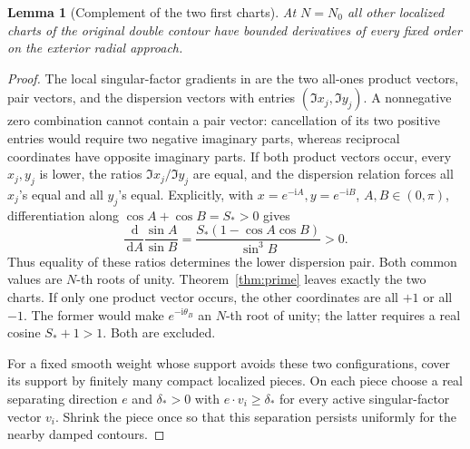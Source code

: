 \documentclass[11pt]{article}
\numberwithin{equation}{section}
\newtheorem{lemma}[theorem]{Lemma}
\theoremstyle{definition}
\newcommand{\dd}{\,\mathrm d}
\newcommand{\ii}{\mathrm i}
\begin{document}
\begin{lemma}[Complement of the two first charts]\label{lem:complement}
At \(N=N_0\) all other localized charts of the original double contour
have bounded derivatives of every fixed order on the exterior radial
approach.
\end{lemma}
\begin{proof}
The local singular-factor gradients in \cite{TW2014} are the two
all-ones product vectors, pair vectors, and the dispersion vectors with
entries \((\Im x_j,\Im y_j)\).
A nonnegative zero combination cannot contain a pair vector:
cancellation of its two positive entries would require two negative
imaginary parts, whereas reciprocal coordinates have opposite imaginary
parts. If both product vectors occur, every \(x_j,y_j\) is lower,
the ratios \(\Im x_j/\Im y_j\) are equal, and the dispersion relation
forces all \(x_j\)'s equal and all \(y_j\)'s equal. Explicitly, with
\(x=e^{-\ii A},y=e^{-\ii B}\), \(A,B\in(0,\pi)\), differentiation
along \(\cos A+\cos B=S_*>0\) gives
\[
 \frac{\dd}{\dd A}\frac{\sin A}{\sin B}
 =\frac{S_*(1-\cos A\cos B)}{\sin^3B}>0.
\]
Thus equality of these ratios determines the lower dispersion pair. Both common values are \(N\)-th
roots of unity. Theorem~\ref{thm:prime} leaves exactly the two charts.
If only one product vector occurs, the other coordinates are all \(+1\)
or all \(-1\). The former would make \(e^{-\ii\theta_B}\) an \(N\)-th
root of unity; the latter requires a real cosine \(S_*+1>1\).
Both are excluded.

For a fixed smooth weight whose support avoids these two
configurations, cover its support by finitely many compact localized
pieces. On each piece choose a real separating direction \(e\) and
\(\delta_*>0\) with \(e\cdot v_i\ge\delta_*\) for every active
singular-factor vector \(v_i\). Shrink the piece once so that this
separation persists uniformly for the nearby damped contours.


\end{proof}
\end{document}
